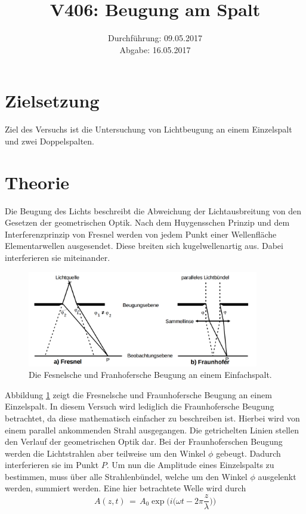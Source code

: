 \documentclass[
  bibliography=totoc,     %
  captions=tableheading,  %
  titlepage=firstiscover, %
]{scrartcl}
\title{V406: Beugung am Spalt}
\author{
  Simon Schulte
  \texorpdfstring{
    \\
    \href{mailto:simon.schulte@udo.edu}{simon.schulte@udo.edu}
  }{}
  \texorpdfstring{\and}{, }
  Tim Sedlaczek
  \texorpdfstring{
    \\
    \href{mailto:tim.sedlaczek@udo.edu}{tim.sedlaczek@udo.edu}
  }{}
}
\date{Durchführung: 09.05.2017\\
      Abgabe: 16.05.2017}
\begin{document}
\maketitle
\thispagestyle{empty}
\tableofcontents
\newpage
\setcounter{page}{1}
\section{Zielsetzung}
\label{sec:zielsetzung}
Ziel des Versuchs ist die Untersuchung von Lichtbeugung an einem Einzelspalt und zwei Doppelspalten.
\section{Theorie}
\label{sec:theorie}
Die Beugung des Lichts beschreibt die Abweichung der Lichtausbreitung von den
Gesetzen der geometrischen Optik. Nach dem Huygensschen Prinzip und dem Interferenzprinzip von Fresnel werden von jedem Punkt einer Wellenfläche Elementarwellen ausgesendet. Diese breiten sich kugelwellenartig aus. Dabei interferieren sie miteinander.
\begin{figure}[htb]
  \centering
  \includegraphics[width=0.9\textwidth]{V4061.png}
  \caption{Die Fesnelsche und Franhofersche Beugung an einem Einfachspalt. \cite{anleitung}}
  \label{fig:V4061}
\end{figure}
Abbildung \ref{fig:V4061} zeigt die Fresnelsche und Fraunhofersche Beugung an einem Einzelspalt. In diesem Versuch wird lediglich die Fraunhofersche Beugung betrachtet, da diese mathematisch einfacher zu beschreiben ist. Hierbei wird von einem parallel ankommenden Strahl ausgegangen. Die getrichelten Linien stellen den Verlauf der geometrischen Optik dar. Bei der Fraunhoferschen Beugung werden die Lichtstrahlen aber teilweise um den Winkel $\phi$ gebeugt. Dadurch interferieren sie im Punkt $P$. Um nun die Amplitude eines Einzelspalts zu bestimmen, muss über alle Strahlenbündel, welche um den Winkel $\phi$ ausgelenkt werden, summiert werden. Eine hier betrachtete Welle wird durch
\begin{equation}
  A(z,t)\,=\,A_0\exp\Big(i\Big(\omega t-2\pi \frac{z}{\lambda}\Big)\Big)
  \label{eqn:welle}
\end{equation}
\end{document}
